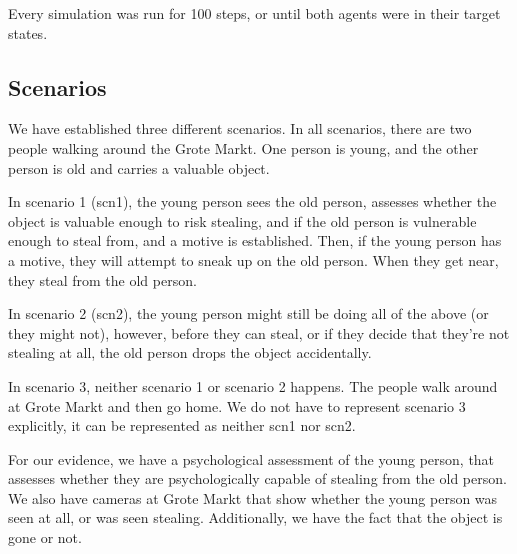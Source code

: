 \documentclass[12pt]{article}
\begin{document}
Every simulation was run for 100 steps, or until both agents were in their target states. 


\subsection{Scenarios}


We have established three different scenarios. In all scenarios, there are two people walking around the Grote Markt. One person is young, and the other person is old and carries a valuable object. 

In scenario 1 (scn1), the young person sees the old person, assesses whether the object is valuable enough to risk stealing, and if the old person is vulnerable enough to steal from, and a motive is established. Then, if the young person has a motive, they will attempt to sneak up on the old person. When they get near, they steal from the old person.

In scenario 2 (scn2), the young person might still be doing all of the above (or they might not), however, before they can steal, or if they decide that they're not stealing at all, the old person drops the object accidentally.

In scenario 3, neither scenario 1 or scenario 2 happens. The people walk around at Grote Markt and then go home. We do not have to represent scenario 3 explicitly, it can be represented as neither scn1 nor scn2.

For our evidence, we have a psychological assessment of the young person, that assesses whether they are psychologically capable of stealing from the old person. We also have cameras at Grote Markt that show whether the young person was seen at all, or was seen stealing. Additionally, we have the fact that the object is gone or not.


\end{document}
